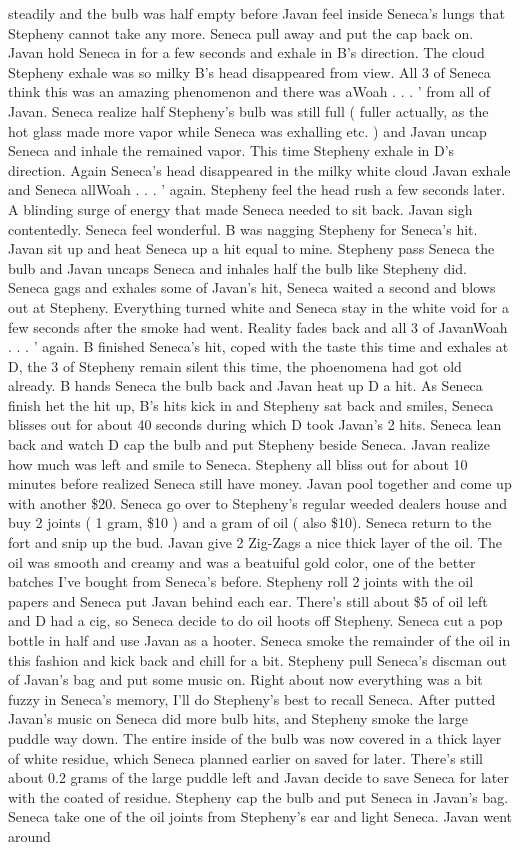 \documentclass[12pt]{book}
\begin{document}
steadily and the bulb was half empty before Javan feel inside Seneca's lungs that Stepheny cannot take any more. Seneca pull away and put the cap back on. Javan hold Seneca in for a few seconds and exhale in B's direction. The cloud Stepheny exhale was so milky B's head disappeared from view. All 3 of Seneca think this was an amazing phenomenon and there was aWoah . . .  ' from all of Javan. Seneca realize half Stepheny's bulb was still full ( fuller actually, as the hot glass made more vapor while Seneca was exhalling etc. ) and Javan uncap Seneca and inhale the remained vapor. This time Stepheny exhale in D's direction. Again Seneca's head disappeared in the milky white cloud Javan exhale and Seneca allWoah . . .  ' again. Stepheny feel the head rush a few seconds later. A blinding surge of energy that made Seneca needed to sit back. Javan sigh contentedly. Seneca feel wonderful. B was nagging Stepheny for Seneca's hit. Javan sit up and heat Seneca up a hit equal to mine. Stepheny pass Seneca the bulb and Javan uncaps Seneca and inhales half the bulb like Stepheny did. Seneca gags and exhales some of Javan's hit, Seneca waited a second and blows out at Stepheny. Everything turned white and Seneca stay in the white void for a few seconds after the smoke had went. Reality fades back and all 3 of JavanWoah . . .  ' again. B finished Seneca's hit, coped with the taste this time and exhales at D, the 3 of Stepheny remain silent this time, the phoenomena had got old already. B hands Seneca the bulb back and Javan heat up D a hit. As Seneca finish het the hit up, B's hits kick in and Stepheny sat back and smiles, Seneca blisses out for about 40 seconds during which D took Javan's 2 hits. Seneca lean back and watch D cap the bulb and put Stepheny beside Seneca. Javan realize how much was left and smile to Seneca. Stepheny all bliss out for about 10 minutes before realized Seneca still have money. Javan pool together and come up with another \$20. Seneca go over to Stepheny's regular weeded dealers house and buy 2 joints ( 1 gram, \$10 ) and a gram of oil ( also \$10). Seneca return to the fort and snip up the bud. Javan give 2 Zig-Zags a nice thick layer of the oil. The oil was smooth and creamy and was a beatuiful gold color, one of the better batches I've bought from Seneca's before. Stepheny roll 2 joints with the oil papers and Seneca put Javan behind each ear. There's still about \$5 of oil left and D had a cig, so Seneca decide to do oil hoots off Stepheny. Seneca cut a pop bottle in half and use Javan as a hooter. Seneca smoke the remainder of the oil in this fashion and kick back and chill for a bit. Stepheny pull Seneca's discman out of Javan's bag and put some music on. Right about now everything was a bit fuzzy in Seneca's memory, I'll do Stepheny's best to recall Seneca. After putted Javan's music on Seneca did more bulb hits, and Stepheny smoke the large puddle way down. The entire inside of the bulb was now covered in a thick layer of white residue, which Seneca planned earlier on saved for later. There's still about 0.2 grams of the large puddle left and Javan decide to save Seneca for later with the coated of residue. Stepheny cap the bulb and put Seneca in Javan's bag. Seneca take one of the oil joints from Stepheny's ear and light Seneca. Javan went around 
\end{document}
